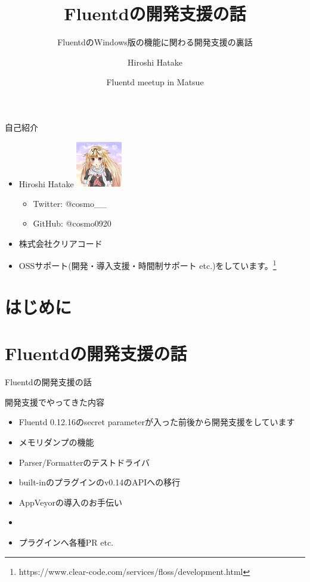\documentclass[12pt, unicode]{beamer}
\title{Fluentdの開発支援の話}
\subtitle{FluentdのWindows版の機能に関わる開発支援の裏話}
\author{Hiroshi Hatake}
\institute[Clear Code Inc.]{株式会社クリアコード}
\date[2016/07/30]{Fluentd meetup in Matsue}
\begin{document}
\frame{\maketitle}

\begin{frame}{自己紹介}
  \begin{itemize}
  \item Hiroshi Hatake \newline \includegraphics[clip,width=2cm]{images/yuudachi.png}
    \begin{itemize}
    \item Twitter: @cosmo\_\_
    \item GitHub: @cosmo0920
    \end{itemize}
  \item 株式会社クリアコード
  \item OSSサポート(開発・導入支援・時間制サポート etc.)をしています。\footnote[frame]{https://www.clear-code.com/services/floss/development.html}
  \end{itemize}
\end{frame}

\section[]{はじめに}
\begin{frame}{}
 \tableofcontents
\end{frame}

\section[]{Fluentdの開発支援の話}
\begin{frame}{Fluentdの開発支援の話}
  \begin{block}{{開発支援でやってきた内容}}
    \begin{itemize}
    \item Fluentd 0.12.16のsecret parameterが入った前後から開発支援をしています
    \item メモリダンプの機能
    \item Parser/Formatterのテストドライバ
    \item built-inのプラグインのv0.14のAPIへの移行
    \item AppVeyorの導入のお手伝い
    \item {}
    \item プラグインへ各種PR etc.
    \end{itemize}
  \end{block}
\end{frame}
\end{document}
